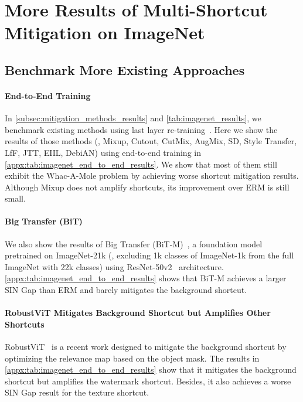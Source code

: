\documentclass[10pt,twocolumn,letterpaper]{article}
\begin{document}
\section{More Results of Multi-Shortcut Mitigation on ImageNet}

\subsection{Benchmark More Existing Approaches}
\label{appx:subsec:more_existing_methods_multi_shortcut}

\paragraph{End-to-End Training} In \cref{subsec:mitigation_methods_results} and \cref{tab:imagenet_results}, we benchmark existing methods using last layer re-training~\cite{kirichenko2022Last}. Here we show the results of those methods (\ie, Mixup, Cutout, CutMix, AugMix, SD, Style Transfer, LfF, JTT, EIIL, DebiAN) using end-to-end training in \cref{appx:tab:imagenet_end_to_end_results}. We show that most of them still exhibit the Whac-A-Mole problem by achieving worse shortcut mitigation results. Although Mixup does not amplify shortcuts, its improvement over ERM is still small.

\paragraph{Big Transfer (BiT)} We also show the results of Big Transfer (BiT-M)~\cite{kolesnikov2020Eur.Conf.Comput.Vis.ECCVBig}, a foundation model pretrained on ImageNet-21k (\ie, excluding 1k classes of ImageNet-1k from the full ImageNet with 22k classes) using ResNet-50v2~\cite{he2016Eur.Conf.Comput.Vis.ECCVIdentity} architecture. \cref{appx:tab:imagenet_end_to_end_results} shows that BiT-M achieves a larger SIN Gap than ERM and barely mitigates the background shortcut.

\paragraph{RobustViT Mitigates Background Shortcut but Amplifies Other Shortcuts} RobustViT~\cite{chefer2022Adv.NeuralInf.Process.Syst.Optimizing} is a recent work designed to mitigate the background shortcut by optimizing the relevance map based on the object mask. The results in \cref{appx:tab:imagenet_end_to_end_results} show that it mitigates the background shortcut but amplifies the watermark shortcut. Besides, it also achieves a worse SIN Gap result for the texture shortcut.
\end{document}
